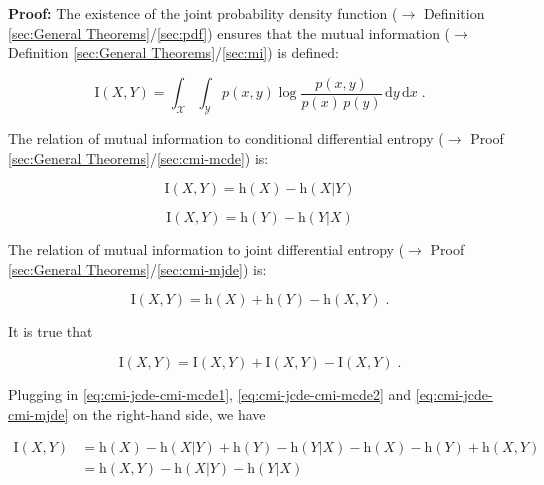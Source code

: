 \documentclass[a4paper,12pt,twoside]{book}
\begin{document}
\vspace{1em}
\textbf{Proof:} The existence of the joint probability density function ($\rightarrow$ Definition \ref{sec:General Theorems}/\ref{sec:pdf}) ensures that the mutual information ($\rightarrow$ Definition \ref{sec:General Theorems}/\ref{sec:mi}) is defined:

\begin{equation} \label{eq:cmi-jcde-MI}
\mathrm{I}(X,Y) = \int_{\mathcal{X}} \int_{\mathcal{Y}} p(x,y) \log \frac{p(x,y)}{p(x)\,p(y)} \, \mathrm{d}y \, \mathrm{d}x \; .
\end{equation}

The relation of mutual information to conditional differential entropy ($\rightarrow$ Proof \ref{sec:General Theorems}/\ref{sec:cmi-mcde}) is:

\begin{equation} \label{eq:cmi-jcde-cmi-mcde1}
\mathrm{I}(X,Y) = \mathrm{h}(X) - \mathrm{h}(X|Y)
\end{equation}

\begin{equation} \label{eq:cmi-jcde-cmi-mcde2}
\mathrm{I}(X,Y) = \mathrm{h}(Y) - \mathrm{h}(Y|X)
\end{equation}

The relation of mutual information to joint differential entropy ($\rightarrow$ Proof \ref{sec:General Theorems}/\ref{sec:cmi-mjde}) is:

\begin{equation} \label{eq:cmi-jcde-cmi-mjde}
\mathrm{I}(X,Y) = \mathrm{h}(X) + \mathrm{h}(Y) - \mathrm{h}(X,Y) \; .
\end{equation}

It is true that

\begin{equation} \label{eq:cmi-jcde-MI-s1}
\mathrm{I}(X,Y) = \mathrm{I}(X,Y) + \mathrm{I}(X,Y) - \mathrm{I}(X,Y) \; .
\end{equation}

Plugging in \eqref{eq:cmi-jcde-cmi-mcde1}, \eqref{eq:cmi-jcde-cmi-mcde2} and \eqref{eq:cmi-jcde-cmi-mjde} on the right-hand side, we have

\begin{equation} \label{eq:cmi-jcde-MI-s2}
\begin{split}
\mathrm{I}(X,Y) &= \mathrm{h}(X) - \mathrm{h}(X|Y) + \mathrm{h}(Y) - \mathrm{h}(Y|X) - \mathrm{h}(X) - \mathrm{h}(Y) + \mathrm{h}(X,Y) \\
&= \mathrm{h}(X,Y) - \mathrm{h}(X|Y) - \mathrm{h}(Y|X)
\end{split}
\end{equation}
\end{document}
